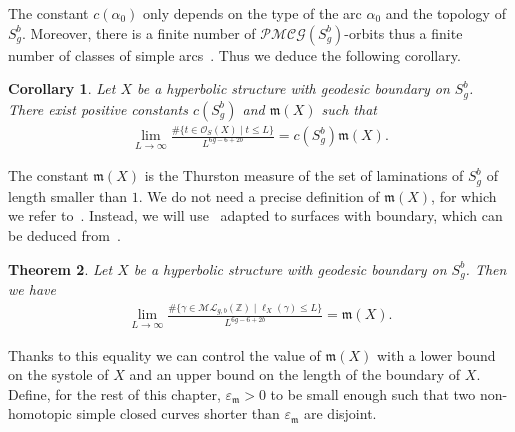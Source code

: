 \documentclass[a4paper,12pt]{article}
\newtheorem{theorem}{Theorem}[section]
\newtheorem{corollaire}[theorem]{Corollary}
\theoremstyle{definition}
\theoremstyle{remark}
\begin{document}
The constant $c(\alpha_0)$ only depends on the type of the arc $\alpha_0$ and the topology of $S_g^b$. Moreover, there is a finite number of $\mathcal{PMCG}(S_g^b)$-orbits thus a finite number of classes of simple arcs~\cite{VivekaJuan}. Thus we deduce the following corollary. 

\begin{corollaire}\label{cor:comptageArc}
    Let $X$ be a hyperbolic structure with geodesic boundary on $S_g^b$. There exist positive constants $c(S_g^b)$ and $\mathfrak{m}(X)$ such that
    \begin{align}
        \lim_{L\to\infty}\frac{\# \{ t \in \mathcal{O}_S(X) \mid t \leqslant L \}}{L^{6g-6+2b}}=c(S_g^b)\mathfrak{m}(X).\label{rel:comptageArcs}
    \end{align}
\end{corollaire}

The constant $\mathfrak{m}(X)$ is the Thurston measure of the set of laminations of $S_g^b$ of length smaller than $1$. We do not need a precise definition of $\mathfrak{m}(X)$, for which we refer to~\cite{VivekaJuan}. Instead, we will use~\cite[Proposition~3.1]{mirzakhani} adapted to surfaces with boundary, which can be deduced from~\cite{MesureThurston}.

\begin{theorem}
    Let $X$ be a hyperbolic structure with geodesic boundary on $S_g^b$. Then we have
    \begin{align}
        \lim_{L\to\infty}\frac{\# \{ \gamma \in \mathcal{ML}_{g,b}(\mathbb{Z}) \mid \ell_X(\gamma) \leqslant L \}}{L^{6g-6+2b}}=\mathfrak{m}(X).\label{rel:mesureThurston}
    \end{align}
\end{theorem}

Thanks to this equality we can control the value of $\mathfrak{m}(X)$ with a lower bound on the systole of $X$ and an upper bound on the length of the boundary of $X$. Define, for the rest of this chapter, $\varepsilon_{\mathfrak{m}}>0$ to be small enough such that two non-homotopic simple closed curves shorter than $\varepsilon_{\mathfrak{m}}$ are disjoint.
\end{document}

